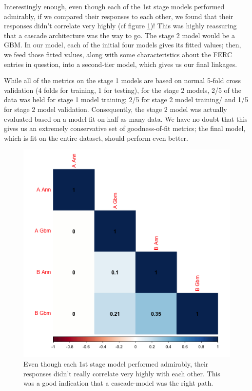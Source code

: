\documentclass{article}
\begin{document}

Interestingly enough, even though each of the 1st stage models performed admirably, if we compared their responses to each other, we found that their responses didn't correlate very highly (cf figure \ref{median_pearsons_cor.png})!
This was highly reassuring that a cascade architecture was the way to go.
The stage 2 model would be a GBM.
In our model, each of the initial four models gives its fitted values; then, we feed those fitted values, along with some characteristics about the FERC entries in question, into a second-tier model, which gives us our final linkages.

While all of the metrics on the stage 1 models are based on normal 5-fold cross validation (4 folds for training, 1 for testing), for the stage 2 models, 2/5 of the data was held for stage 1 model training; 2/5 for stage 2 model training/ and 1/5 for stage 2 model validation. 
Consequently, the stage 2 model was actually evaluated based on a model fit on half as many data. We have no doubt that this gives us an extremely conservative set of goodness-of-fit metrics; the final model, which is fit on the entire dataset, should perform even better.

\begin{figure}[H]
\centering
\includegraphics[width=0.9\linewidth]{median_pearsons_cor.png} 
\caption{Even though each 1st stage model performed admirably, their responses didn't really correlate very highly with each other. This was a good indication that a cascade-model was the right path.}
\label{median_pearsons_cor.png}
\end{figure}
\end{document}

